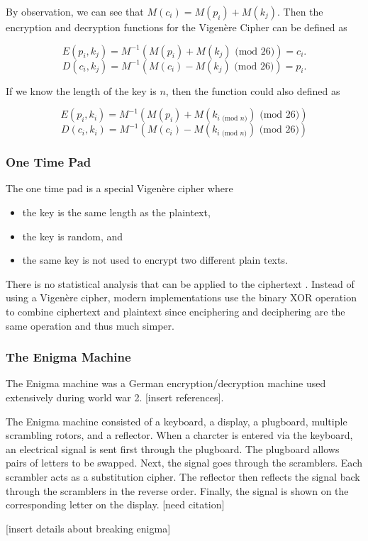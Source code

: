 \documentclass[12pt]{article}
\begin{document}
By observation, we can see that $M(c_i)=M(p_i)+M(k_j)$. Then the encryption and decryption functions for the Vigen\`{e}re Cipher can be defined as 

$$E(p_i, k_j)=M^{-1}(M(p_i)+M(k_j)\text{ (mod 26)})=c_i.$$
$$D(c_i, k_j)=M^{-1}(M(c_i)-M(k_j)\text{ (mod 26)})=p_i.$$

If we know the length of the key is $n$, then the function could also defined as

$$E(p_i, k_i)=M^{-1}(M(p_i)+M(k_{i\text{ (mod $n$)}}) \text{ (mod 26)})$$
$$D(c_i, k_i)=M^{-1}(M(c_i)-M(k_{i\text{ (mod $n$)}}) \text{ (mod 26)})$$

\subsubsection{One Time Pad}
The one time pad is a special Vigen\`{e}re cipher where
\begin{itemize}
	\item the key is the same length as the plaintext,
	\item the key is random, and
	\item the same key is not used to encrypt two different plain texts.
\end{itemize}
There is no statistical analysis that can be applied to the ciphertext \cite[pg. 393]{compsec}. Instead of using a Vigen\`{e}re cipher, modern implementations use the binary XOR operation to combine ciphertext and plaintext since enciphering and deciphering are the same operation and thus much simper.

\subsubsection{The Enigma Machine}
The Enigma machine was a German encryption/decryption machine used extensively during world war 2. [insert references].

The Enigma machine consisted of a keyboard, a display, a plugboard, multiple scrambling rotors, and a reflector. When a charcter is entered via the keyboard, an electrical signal is sent first through the plugboard. The plugboard allows pairs of letters to be swapped. Next, the signal goes through the scramblers. Each scrambler acts as a substitution cipher. The reflector then reflects the signal back through the scramblers in the reverse order. Finally, the signal is shown on the corresponding letter on the display. [need citation]

[insert details about breaking enigma]
\end{document}
